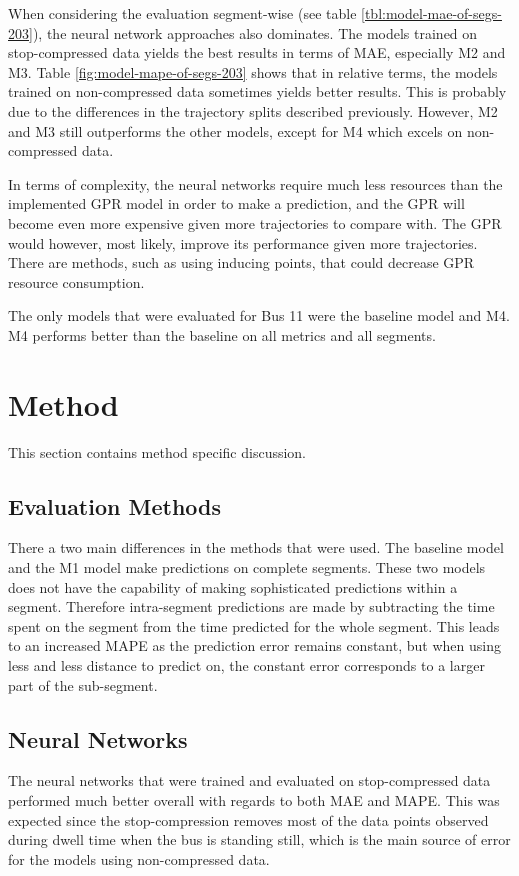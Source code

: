 When considering the evaluation segment-wise (see table \ref{tbl:model-mae-of-segs-203}), the neural network approaches also dominates. The models trained on stop-compressed data yields the best results in terms of MAE, especially M2 and M3. Table \ref{fig:model-mape-of-segs-203} shows that in relative terms, the models trained on non-compressed data sometimes yields better results. This is probably due to the differences in the trajectory splits described previously. However, M2 and M3 still outperforms the other models,  except for M4 which excels on non-compressed data.

In terms of complexity, the neural networks require much less resources than the implemented GPR model in order to make a prediction, and the GPR will become even more expensive given more trajectories to compare with. The GPR would however, most likely, improve its performance given more trajectories. There are methods, such as using inducing points, that could decrease GPR resource consumption.

The only models that were evaluated for Bus 11 were the baseline model and M4. M4 performs better than the baseline on all metrics and all segments. 

\section{Method}
This section contains method specific discussion.

\label{sec:discussion-method}
\subsection{Evaluation Methods}
There a two main differences in the methods that were used. The baseline model and the M1 model make predictions on complete segments. These two models does not have the capability of making sophisticated predictions within a segment. Therefore intra-segment predictions are made by subtracting the time spent on the segment from the time predicted for the whole segment. This leads to an increased MAPE as the prediction error remains constant, but when using less and less distance to predict on, the constant error corresponds to a larger part of the sub-segment.

\subsection{Neural Networks}
The neural networks that were trained and evaluated on stop-compressed data performed much better overall with regards to both MAE and MAPE. This was expected since the stop-compression removes most of the data points observed during dwell time when the bus is standing still, which is the main source of error for the models using non-compressed data. 

